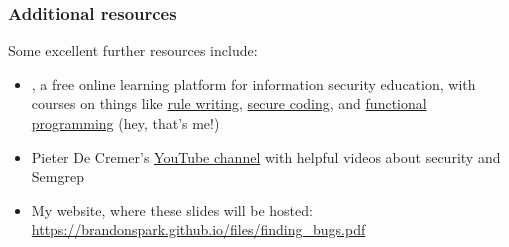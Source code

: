 \documentclass[aspectratio=169, handout]{beamer}
\begin{document}
\begin{frame}[fragile]
  \frametitle{Additional resources}

  Some excellent further resources include:
  \pause
  \begin{itemize}
    \item {}, a free online learning platform for
    information security education, with courses on things like
    {\color{blue}\href{https://academy.semgrep.dev/courses/custom-rules}{rule
    writing}},
    {\color{blue}\href{https://academy.semgrep.dev/courses/secure-coding}{secure
    coding}}, and
    {\color{blue}\href{https://academy.semgrep.dev/courses/principles-of-functional-programming}{functional
    programming}} (hey, that's me!)
    \item Pieter De Cremer's {\color{blue}\href{https://www.youtube.com/@0xDC0DE/videos}{YouTube channel}} with
    helpful videos about security and Semgrep
    \item My website, where these slides will be hosted: {\color{blue}\href{https://brandonspark.github.io/files/finding_bugs.pdf}{https://brandonspark.github.io/files/finding\_bugs.pdf}}
  \end{itemize}
\end{frame}

\thankyou
\end{document}
